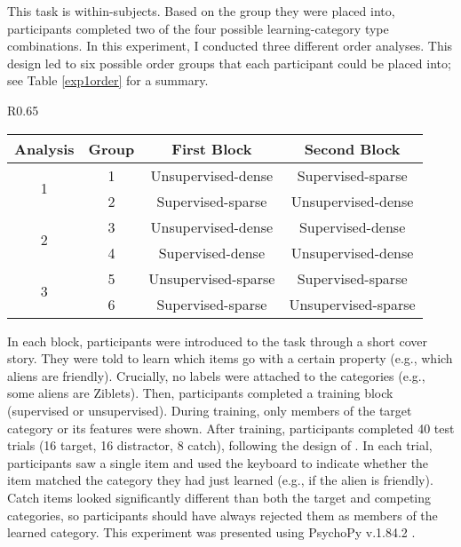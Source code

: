 \documentclass[../dissertation.tex]{subfiles}
\begin{document}
	This task is within-subjects. Based on the group they were placed into, participants completed two of the four possible learning-category type combinations. In this experiment, I conducted three different order analyses. This design led to six possible order groups that each participant could be placed into; see Table \ref{exp1order} for a summary. 

\begin{wraptable}[8]{R}{0.65\linewidth}
\vspace{-10pt}
\caption{Block orders for statistical density task.}
\vspace{-10pt}
\begin{center}
\begin{tabular}{cccc}
 \toprule
 Analysis & Group & First Block & Second Block \\ 
 \midrule
 \multirow{2}{*}{1} & 1 & Unsupervised-dense & Supervised-sparse \\ 
 & 2 & Supervised-sparse & Unsupervised-dense \\ 
 \midrule
  \multirow{2}{*}{2} & 3 & Unsupervised-dense & Supervised-dense \\ 
 & 4 & Supervised-dense & Unsupervised-dense \\
 \midrule
  \multirow{2}{*}{3} & 5 & Unsupervised-sparse & Supervised-sparse \\ 
 & 6 & Supervised-sparse & Unsupervised-sparse \\ 
 \bottomrule 
\end{tabular}
\end{center}
\vspace{-20pt}
\label{exp1order}
\end{wraptable} \par
 In each block, participants were introduced to the task through a short cover story. They were told to learn which items go with a certain property (e.g., which aliens are friendly). Crucially, no labels were attached to the categories (e.g., some aliens are Ziblets). Then, participants completed a training block (supervised or unsupervised). During training, only members of the target category or its features were shown. After training, participants completed 40 test trials (16 target, 16 distractor, 8 catch), following the design of \citet{Kloos2008}. In each trial, participants saw a single item and used the keyboard to indicate whether the item matched the category they had just learned (e.g., if the alien is friendly). Catch items looked significantly different than both the target and competing categories, so participants should have always rejected them as members of the learned category. This experiment was presented using PsychoPy v.1.84.2 \citep{Peirce2007}. \par
\end{document}
